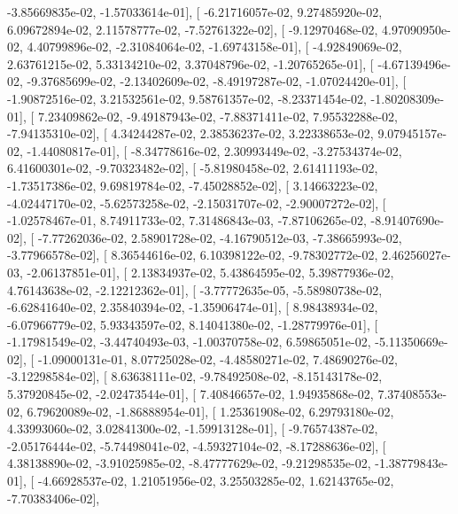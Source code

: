 \documentclass{article}
\begin{document}
         -3.85669835e-02,  -1.57033614e-01],
       [ -6.21716057e-02,   9.27485920e-02,   6.09672894e-02,
          2.11578777e-02,  -7.52761322e-02],
       [ -9.12970468e-02,   4.97090950e-02,   4.40799896e-02,
         -2.31084064e-02,  -1.69743158e-01],
       [ -4.92849069e-02,   2.63761215e-02,   5.33134210e-02,
          3.37048796e-02,  -1.20765265e-01],
       [ -4.67139496e-02,  -9.37685699e-02,  -2.13402609e-02,
         -8.49197287e-02,  -1.07024420e-01],
       [ -1.90872516e-02,   3.21532561e-02,   9.58761357e-02,
         -8.23371454e-02,  -1.80208309e-01],
       [  7.23409862e-02,  -9.49187943e-02,  -7.88371411e-02,
          7.95532288e-02,  -7.94135310e-02],
       [  4.34244287e-02,   2.38536237e-02,   3.22338653e-02,
          9.07945157e-02,  -1.44080817e-01],
       [ -8.34778616e-02,   2.30993449e-02,  -3.27534374e-02,
          6.41600301e-02,  -9.70323482e-02],
       [ -5.81980458e-02,   2.61411193e-02,  -1.73517386e-02,
          9.69819784e-02,  -7.45028852e-02],
       [  3.14663223e-02,  -4.02447170e-02,  -5.62573258e-02,
         -2.15031707e-02,  -2.90007272e-02],
       [ -1.02578467e-01,   8.74911733e-02,   7.31486843e-03,
         -7.87106265e-02,  -8.91407690e-02],
       [ -7.77262036e-02,   2.58901728e-02,  -4.16790512e-03,
         -7.38665993e-02,  -3.77966578e-02],
       [  8.36544616e-02,   6.10398122e-02,  -9.78302772e-02,
          2.46256027e-03,  -2.06137851e-01],
       [  2.13834937e-02,   5.43864595e-02,   5.39877936e-02,
          4.76143638e-02,  -2.12212362e-01],
       [ -3.77772635e-05,  -5.58980738e-02,  -6.62841640e-02,
          2.35840394e-02,  -1.35906474e-01],
       [  8.98438934e-02,  -6.07966779e-02,   5.93343597e-02,
          8.14041380e-02,  -1.28779976e-01],
       [ -1.17981549e-02,  -3.44740493e-03,  -1.00370758e-02,
          6.59865051e-02,  -5.11350669e-02],
       [ -1.09000131e-01,   8.07725028e-02,  -4.48580271e-02,
          7.48690276e-02,  -3.12298584e-02],
       [  8.63638111e-02,  -9.78492508e-02,  -8.15143178e-02,
          5.37920845e-02,  -2.02473544e-01],
       [  7.40846657e-02,   1.94935868e-02,   7.37408553e-02,
          6.79620089e-02,  -1.86888954e-01],
       [  1.25361908e-02,   6.29793180e-02,   4.33993060e-02,
          3.02841300e-02,  -1.59913128e-01],
       [ -9.76574387e-02,  -2.05176444e-02,  -5.74498041e-02,
         -4.59327104e-02,  -8.17288636e-02],
       [  4.38138890e-02,  -3.91025985e-02,  -8.47777629e-02,
         -9.21298535e-02,  -1.38779843e-01],
       [ -4.66928537e-02,   1.21051956e-02,   3.25503285e-02,
          1.62143765e-02,  -7.70383406e-02],
\end{document}
